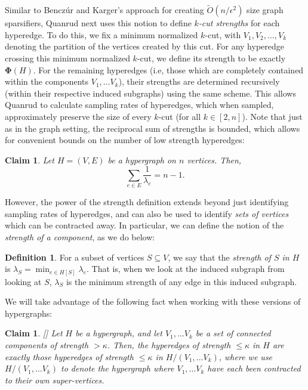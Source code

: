 \documentclass[11pt]{article}
\newtheorem{claim}[theorem]{Claim}
\theoremstyle{definition}
\newtheorem{definition}[theorem]{Definition}
\newcommand{\eps}{\epsilon}
\newcommand{\minkcut}{\mathbf{\Phi}}
\begin{document}
Similar to Bencz\'ur and Karger's \cite{BK96} approach for creating $\widetilde{O}(n / \eps^2)$ size graph sparsifiers, Quanrud \cite{Qua23} next uses this notion to define \emph{$k$-cut strengths} for each hyperedge. To do this, we fix a minimum normalized $k$-cut, with $V_1, V_2, ..., V_k$ denoting the partition of the vertices created by this cut. For any hyperedge crossing this minimum normalized $k$-cut, we define its strength to be exactly $\minkcut(H)$. For the remaining hyperedges (i.e, those which are completely contained within the components $V_1, \dots V_k$), their strengths are determined recursively (within their respective induced subgraphs) using the same scheme. This allows Quanrud \cite{Qua23} to calculate sampling rates of hyperedges, which when sampled, approximately preserve the size of every $k$-cut (for all $k \in [2, n]$). Note that just as in the graph setting, the reciprocal sum of strengths is bounded, which allows for convenient bounds on the number of low strength hyperedges: 

\begin{claim}\cite{Qua23}\label{clm:lowstrengthBound}
    Let $H = (V, E)$ be a hypergraph on $n$ vertices. Then,
    \[
    \sum_{e \in E} \frac{1}{\lambda_e} = n-1.
    \]
\end{claim}

However, the power of the strength definition extends beyond just identifying sampling rates of hyperedges, and can also be used to identify \emph{sets of vertices} which can be contracted away. In particular, we can define the notion of the \emph{strength of a component}, as we do below:

\begin{definition}
    For a subset of vertices $ S \subseteq V$, we say that the \emph{strength of $S$ in $H$} is $\lambda_S = \min_{e \in H[S]} \lambda_e$. That is, when we look at the induced subgraph from looking at $S$, $\lambda_S$ is the minimum strength of any edge in this induced subgraph. 
\end{definition}

We will take advantage of the following fact when working with these  versions of hypergraphs:

\begin{claim}\label{clm:minkcutcontracted}[\cite{KPS24d}]
    Let $H$ be a hypergraph, and let $V_1, \dots V_k$ be a set of connected components of strength $> \kappa$. Then, the hyperedges of strength $\leq \kappa$ in $H$ are exactly those hyperedges of strength $\leq \kappa$ in $H/(V_1, \dots V_k)$, where we use $H/(V_1, \dots V_k)$ to denote the hypergraph where $V_1, \dots V_k$ have each been \emph{contracted} to their own super-vertices.
\end{claim}
\end{document}
